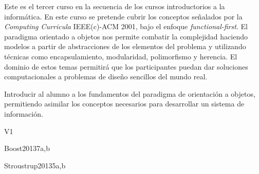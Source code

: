 \begin{syllabus}


\begin{justification}
   Este es el tercer curso en la secuencia de los cursos introductorios a la informática. En este curso se pretende cubrir los conceptos señalados por la \textit{Computing Curricula} IEEE(c)-ACM 2001, bajo el enfoque \textit{functional-first}. 
   El paradigma orientado a objetos nos permite combatir la complejidad haciendo modelos a partir de abstracciones de los elementos del problema y utilizando técnicas como encapsulamiento,
   modularidad, polimorfismo y herencia. El dominio de estos temas permitirá que los participantes puedan dar soluciones computacionales a problemas de diseño sencillos del mundo real.
   \end{justification}
   
   \begin{goals}
   \item Introducir al alumno a los fundamentos del paradigma de orientación a objetos, permitiendo asimilar los conceptos necesarios para desarrollar un sistema de información.
   \end{goals}
   
   \begin{outcomes}{V1}
      \item {}
      \item {}
      \item {}
      \item {}
      \item {}
      \item {}
   \end{outcomes}
   
   \begin{unit}{\DSGraphsandTrees}{}{Boost2013}{7}{a,b}
       \DSGraphsandTreesAllTopics
       \DSGraphsandTreesAllLearningOutcomes
   \end{unit}
   
   \begin{unit}{\GVFundamentalConcepts}{}{Stroustrup2013}{5}{a,b}
      \GVFundamentalConceptsAllTopics
      \GVFundamentalConceptsAllLearningOutcomes
   \end{unit}
   

\end{syllabus}
